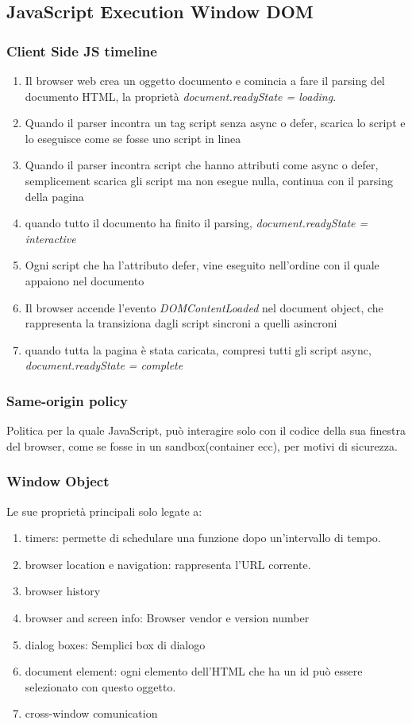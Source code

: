 \subsection{JavaScript Execution Window DOM}
\subsubsection{Client Side JS timeline}
\begin{enumerate}
    \item Il browser web crea un oggetto documento e comincia a fare il parsing del documento HTML, la proprietà \textit{document.readyState = loading}.
    \item Quando il parser incontra un tag script senza async o defer, scarica lo script e lo eseguisce come se fosse uno script in linea
    \item Quando il parser incontra script che hanno attributi come async o defer, semplicement scarica gli script ma non esegue nulla, continua con il parsing della pagina
    \item quando tutto il documento ha finito il parsing, \textit{document.readyState = interactive}
    \item Ogni script che ha l'attributo defer, vine eseguito nell'ordine con il quale appaiono nel documento
    \item Il browser accende l'evento \textit{DOMContentLoaded} nel document object, che rappresenta la transiziona dagli script sincroni a quelli asincroni
    \item quando tutta la pagina è stata caricata, compresi tutti gli script async, \textit{document.readyState = complete}
\end{enumerate}

\subsubsection{Same-origin policy}
Politica per la quale JavaScript, può interagire solo con il codice della sua finestra del browser, come se fosse in un sandbox(container ecc), per motivi di sicurezza.

\subsubsection{Window Object}
Le sue proprietà principali solo legate a:
\begin{enumerate}
    \item timers: permette di schedulare una funzione dopo un'intervallo di tempo.
    \item browser location e navigation: rappresenta l'URL corrente.
    \item browser history
    \item browser and screen info: Browser vendor e version number
    \item dialog boxes: Semplici box di dialogo
    \item document element: ogni elemento dell'HTML che ha un id può essere selezionato con questo oggetto.
    \item cross-window comunication
\end{enumerate}

